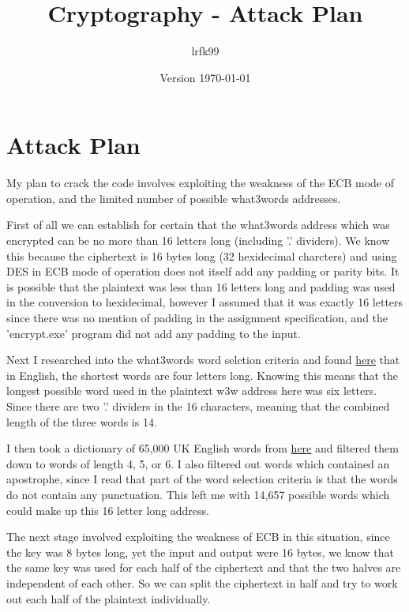 \documentclass[a4paper, 11pt]{article}
\title{Cryptography - Attack Plan}
\date{Version \today}
\author{lrfk99}
\begin{document}
\maketitle

\section{Attack Plan}
 
My plan to crack the code involves exploiting the weakness of the ECB mode of operation, and the limited number of possible what3words addresses.

First of all we can establish for certain that the what3words address which was encrypted can be no more than 16 letters long (including '.' dividers). 
We know this because the ciphertext is 16 bytes long (32 hexidecimal charcters) and using DES in ECB mode of operation does not itself add any padding or parity bits. 
It is possible that the plaintext was less than 16 letters long and padding was used in the conversion to hexidecimal, 
however I assumed that it was exactly 16 letters since there was no mention of padding in the assignment specification, 
and the 'encrypt.exe' program did not add any padding to the input.

Next I researched into the what3words word selction criteria and found \href{https://support.what3words.com/en/articles/2212810-what-are-the-shortest-and-longest-words-used}{here}
that in English, the shortest words are four letters long. 
Knowing this means that the longest possible word used in the plaintext w3w address here was six letters. 
Since there are two '.' dividers in the 16 characters, meaning that the combined length of the three words is 14.

I then took a dictionary of 65,000 UK English words from \href{http://gwicks.net/dictionaries.htm}{here} and filtered them down to words of length 4, 5, or 6. 
I also filtered out words which contained an apostrophe, since I read that part of the word selection criteria is that the words do not contain any punctuation. 
This left me with 14,657 possible words which could make up this 16 letter long address. 

The next stage involved exploiting the weakness of ECB in this situation, since the key was 8 bytes long, yet the input and output were 16 bytes, 
we know that the same key was used for each half of the ciphertext and that the two halves are independent of each other. 
So we can split the ciphertext in half and try to work out each half of the plaintext individually. 
\end{document}

